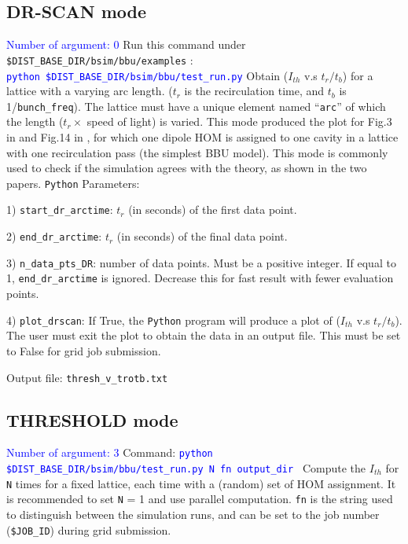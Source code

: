\documentclass{hitec}
\begin{document}
\subsection{DR-SCAN mode}
\textcolor{blue}{Number of argument: 0}
\bigbreak
Run this command under \texttt{ \$DIST_BASE_DIR/bsim/bbu/examples} :
\\
\textcolor{blue}{\texttt{python   \$DIST_BASE_DIR/bsim/bbu/test_run.py}} 
\bigbreak
Obtain ($I_{th}$ v.s $t_r/t_b$) for a lattice with a varying arc length. ($t_r$ is the recirculation time, and $t_b$ is 1/\texttt{bunch_freq}). The lattice must have a unique element named ``\texttt{arc}'' of which the length ($t_r \times$ speed of light) is varied.
This mode produced the plot for Fig.3 in \cite{GeorgBBU} and Fig.14 in \cite{WlouBBU}, for which one dipole HOM is assigned to one cavity in a lattice with one recirculation pass (the simplest BBU model). This mode is commonly used to check if the simulation agrees with the theory, as shown in the two papers.
\bigbreak
\texttt{Python} Parameters:

1) \texttt{start_dr_arctime}: $t_r$ (in seconds) of the first data point.

2) \texttt{end_dr_arctime}: $t_r$ (in seconds) of the final data point.

3) \texttt{n_data_pts_DR}: number of data points. Must be a positive integer. If equal to 1, \texttt{end_dr_arctime} is ignored. Decrease this for fast result with fewer evaluation points.

4) \texttt{plot_drscan}: If True, the \texttt{Python} program will produce a plot of ($I_{th}$ v.s $t_r/t_b$). The user must exit the plot to obtain the data in an output file. This must be set to False for grid job submission.  

\bigbreak
Output file: \texttt{thresh_v_trotb.txt}

\subsection{THRESHOLD mode}      
\textcolor{blue}{Number of argument: 3}
\bigbreak
Command: \textcolor{blue}{\texttt{python \$DIST_BASE_DIR/bsim/bbu/test_run.py  \text{} N \text{} fn \text{} output_dir }}
\bigbreak
Compute the $I_{th}$ for \texttt{N} times for a fixed lattice, each time with a (random) set of HOM assignment. It is recommended to set \texttt{N} = 1 and use parallel computation. \texttt{fn} is the string used to distinguish between the simulation runs, and can be set to the job number (\texttt{\$JOB_ID}) during grid submission.
\end{document}
